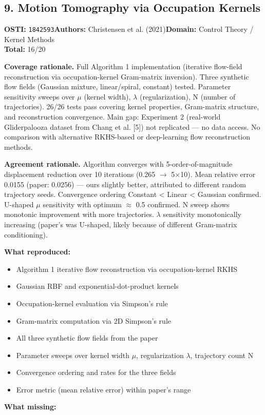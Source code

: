 \subsection{9. Motion Tomography via Occupation Kernels}
\textbf{OSTI:} \texttt{1842593}\quad\textbf{Authors:} Christensen et al. (2021)\quad\textbf{Domain:} Control Theory / Kernel Methods\\
\quad{}\quad\textbf{Total:} 16/20\par\smallskip
\noindent\textbf{Coverage rationale.} Full Algorithm 1 implementation (iterative flow-field reconstruction via occupation-kernel Gram-matrix inversion). Three synthetic flow fields (Gaussian mixture, linear/spiral, constant) tested. Parameter sensitivity sweeps over $\mu$ (kernel width), $\lambda$ (regularization), N (number of trajectories). 26/26 tests pass covering kernel properties, Gram-matrix structure, and reconstruction convergence. Main gap: Experiment 2 (real-world Gliderpalooza dataset from Chang et al. [5]) not replicated --- no data access. No comparison with alternative RKHS-based or deep-learning flow reconstruction methods.\par
\noindent\textbf{Agreement rationale.} Algorithm converges with 5-order-of-magnitude displacement reduction over 10 iterations (0.265 $\rightarrow$ 5$\times$10). Mean relative error 0.0155 (paper: 0.0256) --- ours slightly better, attributed to different random trajectory seeds. Convergence ordering Constant \textless{} Linear \textless{} Gaussian confirmed. U-shaped $\mu$ sensitivity with optimum $\approx$ 0.5 confirmed. N sweep shows monotonic improvement with more trajectories. $\lambda$ sensitivity monotonically increasing (paper's was U-shaped, likely because of different Gram-matrix conditioning).\par\smallskip
\noindent\textbf{What reproduced:}
\begin{itemize}[leftmargin=1.4em,itemsep=0.2em,topsep=0.2em]
\item Algorithm 1 iterative flow reconstruction via occupation-kernel RKHS
\item Gaussian RBF and exponential-dot-product kernels
\item Occupation-kernel evaluation via Simpson's rule
\item Gram-matrix computation via 2D Simpson's rule
\item All three synthetic flow fields from the paper
\item Parameter sweeps over kernel width $\mu$, regularization $\lambda$, trajectory count N
\item Convergence ordering and rates for the three fields
\item Error metric (mean relative error) within paper's range
\end{itemize}\noindent\textbf{What missing:}
